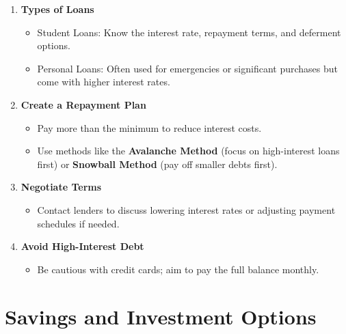 \documentclass[
  letterpaper,
  DIV=11,
  numbers=noendperiod]{scrreprt}
\providecommand{\tightlist}{%
  \setlength{\itemsep}{0pt}\setlength{\parskip}{0pt}}\usepackage{longtable,booktabs,array}
\begin{document}
\begin{enumerate}
\def\labelenumi{\arabic{enumi}.}
\item
  \textbf{Types of Loans}

  \begin{itemize}
  \tightlist
  \item
    Student Loans: Know the interest rate, repayment terms, and
    deferment options.
  \item
    Personal Loans: Often used for emergencies or significant purchases
    but come with higher interest rates.
  \end{itemize}
\item
  \textbf{Create a Repayment Plan}

  \begin{itemize}
  \tightlist
  \item
    Pay more than the minimum to reduce interest costs.
  \item
    Use methods like the \textbf{Avalanche Method} (focus on
    high-interest loans first) or \textbf{Snowball Method} (pay off
    smaller debts first).
  \end{itemize}
\item
  \textbf{Negotiate Terms}

  \begin{itemize}
  \tightlist
  \item
    Contact lenders to discuss lowering interest rates or adjusting
    payment schedules if needed.
  \end{itemize}
\item
  \textbf{Avoid High-Interest Debt}

  \begin{itemize}
  \tightlist
  \item
    Be cautious with credit cards; aim to pay the full balance monthly.
  \end{itemize}
\end{enumerate}

\section{Savings and Investment
Options}\label{savings-and-investment-options}
\end{document}
